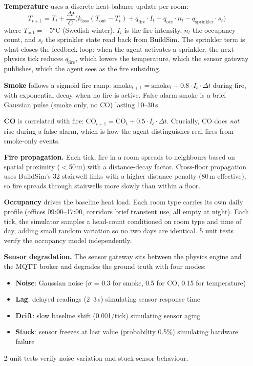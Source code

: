 \documentclass[11pt]{article}
\providecommand{\tightlist}{\setlength{\itemsep}{0pt}\setlength{\parskip}{0pt}}
\begin{document}
\textbf{Temperature} uses a discrete heat-balance update per room:
\[
T_{t+1} = T_t + \frac{\Delta t}{C}\bigl(k_{\text{loss}}(T_{\text{out}} - T_t) + q_{\text{fire}} \cdot I_t + q_{\text{occ}} \cdot n_t - q_{\text{sprinkler}} \cdot s_t\bigr)
\]
where $T_{\text{out}} = -5$°C (Swedish winter), $I_t$ is the fire intensity, $n_t$ the occupancy count, and $s_t$ the sprinkler state read back from BuildSim. The sprinkler term is what closes the feedback loop: when the agent activates a sprinkler, the next physics tick reduces $q_{\text{fire}}$, which lowers the temperature, which the sensor gateway publishes, which the agent sees as the fire subsiding.

\textbf{Smoke} follows a sigmoid fire ramp: $\text{smoke}_{t+1} = \text{smoke}_t + 0.8 \cdot I_t \cdot \Delta t$ during fire, with exponential decay when no fire is active. False alarm smoke is a brief Gaussian pulse (smoke only, no CO) lasting 10--30\,s.

\textbf{CO} is correlated with fire: $\text{CO}_{t+1} = \text{CO}_t + 0.5 \cdot I_t \cdot \Delta t$. Crucially, CO does \emph{not} rise during a false alarm, which is how the agent distinguishes real fires from smoke-only events.

\textbf{Fire propagation.} Each tick, fire in a room spreads to neighbours based on spatial proximity ($<$50\,m) with a distance-decay factor. Cross-floor propagation uses BuildSim's 32 stairwell links with a higher distance penalty (80\,m effective), so fire spreads through stairwells more slowly than within a floor.

\textbf{Occupancy} drives the baseline heat load. Each room type carries its own daily profile (offices 09:00--17:00, corridors brief transient use, all empty at night). Each tick, the simulator samples a head-count conditioned on room type and time of day, adding small random variation so no two days are identical. 5 unit tests verify the occupancy model independently.

\textbf{Sensor degradation.} The sensor gateway sits between the physics engine and the MQTT broker and degrades the ground truth with four modes:
\begin{itemize}\tightlist
  \item \textbf{Noise}: Gaussian noise ($\sigma$ = 0.3 for smoke, 0.5 for CO, 0.15 for temperature)
  \item \textbf{Lag}: delayed readings (2--3\,s) simulating sensor response time
  \item \textbf{Drift}: slow baseline shift (0.001/tick) simulating sensor aging
  \item \textbf{Stuck}: sensor freezes at last value (probability 0.5\%) simulating hardware failure
\end{itemize}
2 unit tests verify noise variation and stuck-sensor behaviour.
\end{document}
